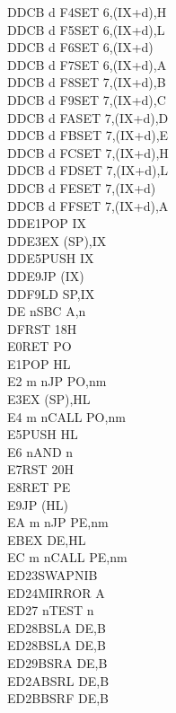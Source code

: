 \begin{multicols}{3}
{\begin{tabbing}
    DDCB d F4\>SET 6,(IX+d),H\UNDOC\\
    DDCB d F5\>SET 6,(IX+d),L\UNDOC\\
    DDCB d F6\>SET 6,(IX+d)\\
    DDCB d F7\>SET 6,(IX+d),A\UNDOC\\
    DDCB d F8\>SET 7,(IX+d),B\UNDOC\\
    DDCB d F9\>SET 7,(IX+d),C\UNDOC\\
    DDCB d FA\>SET 7,(IX+d),D\UNDOC\\
    DDCB d FB\>SET 7,(IX+d),E\UNDOC\\
    DDCB d FC\>SET 7,(IX+d),H\UNDOC\\
    DDCB d FD\>SET 7,(IX+d),L\UNDOC\\
    DDCB d FE\>SET 7,(IX+d)\\
    DDCB d FF\>SET 7,(IX+d),A\UNDOC\\
    DDE1\>POP IX\\
    DDE3\>EX (SP),IX\\
    DDE5\>PUSH IX\\
    DDE9\>JP (IX)\\
    DDF9\>LD SP,IX\\
    DE n\>SBC A,n\\
    DF\>RST 18H\\
    E0\>RET PO\\
    E1\>POP HL\\
    E2 m n\>JP PO,nm\\
    E3\>EX (SP),HL\\
    E4 m n\>CALL PO,nm\\
    E5\>PUSH HL\\
    E6 n\>AND n\\
    E7\>RST 20H\\
    E8\>RET PE\\
    E9\>JP (HL)\\
    EA m n\>JP PE,nm\\
    EB\>EX DE,HL\\
    EC m n\>CALL PE,nm\\
    ED23\>SWAPNIB\ZXN\\
    ED24\>MIRROR A\ZXN\\
    ED27 n\>TEST n\ZXN\\
    ED28\>BSLA DE,B\ZXN\\
    ED28\>BSLA DE,B\ZXN\\
    ED29\>BSRA DE,B\ZXN\\
    ED2A\>BSRL DE,B\ZXN\\
    ED2B\>BSRF DE,B\ZXN\\

\end{tabbing}}
\end{multicols}
